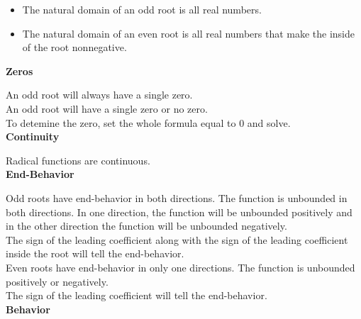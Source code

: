 \documentclass{ximera}
\begin{document}
\begin{itemize}
\item The natural domain of an odd root is all real numbers.
\item The natural domain of an even root is all real numbers that make the inside of the root nonnegative.
\end{itemize}






\textbf{\textcolor{blue!55!black}{Zeros}}


An odd root will always have a single zero. \\

An odd root will have a single zero or no zero. \\

To detemine the zero, set the whole formula equal to $0$ and solve. \\







\textbf{\textcolor{blue!55!black}{Continuity}}


Radical functions are continuous.\\





\textbf{\textcolor{blue!55!black}{End-Behavior}}



Odd roots have end-behavior in both directions.  The function is unbounded in both directions.  In one direction, the function will be unbounded positively and in the other direction the function will be unbounded negatively. \\

The sign of the leading coefficient along with the sign of the leading coefficient inside the root will tell the end-behavior. \\



Even roots have end-behavior in only one directions.  The function is unbounded positively or negatively. \\

The sign of the leading coefficient will tell the end-behavior. \\









\textbf{\textcolor{blue!55!black}{Behavior}}
\end{document}
